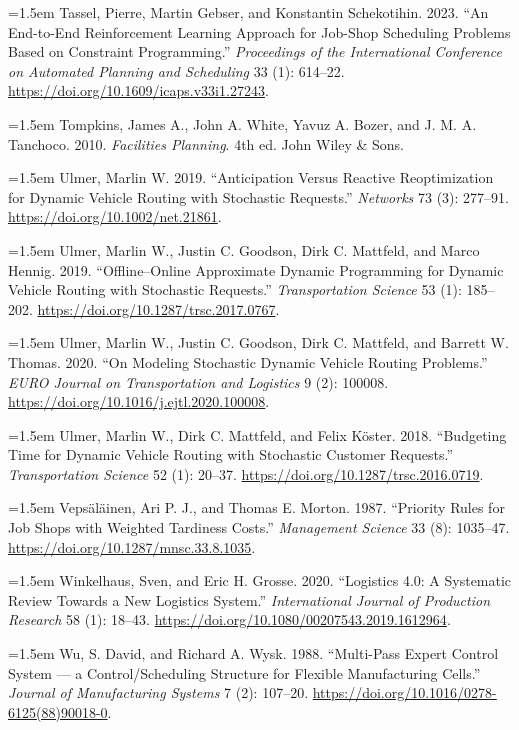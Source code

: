 \documentclass[review,3p,times]{elsarticle}
\newcommand{\citeproctext}{}
\newenvironment{CSLReferences}[2]{%
  \par\addvspace{\baselineskip}%
  \renewcommand{\bibitem}[2][]{\par\addvspace{0.35\baselineskip}\noindent\hangindent=1.5em\hangafter=1}%
}{\par}
\theoremstyle{definition}
\begin{document}
\begin{CSLReferences}{1}{1}
\bibitem[\citeproctext]{ref-tassel2023rljssp}
Tassel, Pierre, Martin Gebser, and Konstantin Schekotihin. 2023. {``An
End-to-End Reinforcement Learning Approach for Job-Shop Scheduling
Problems Based on Constraint Programming.''} \emph{Proceedings of the
International Conference on Automated Planning and Scheduling} 33 (1):
614--22. \url{https://doi.org/10.1609/icaps.v33i1.27243}.

\bibitem[\citeproctext]{ref-tompkins2010facilities}
Tompkins, James A., John A. White, Yavuz A. Bozer, and J. M. A.
Tanchoco. 2010. \emph{Facilities Planning}. 4th ed. John Wiley \& Sons.

\bibitem[\citeproctext]{ref-ulmer2019anticipation}
Ulmer, Marlin W. 2019. {``Anticipation Versus Reactive Reoptimization
for Dynamic Vehicle Routing with Stochastic Requests.''} \emph{Networks}
73 (3): 277--91. \url{https://doi.org/10.1002/net.21861}.

\bibitem[\citeproctext]{ref-ulmer2019offlineonline}
Ulmer, Marlin W., Justin C. Goodson, Dirk C. Mattfeld, and Marco Hennig.
2019. {``Offline--Online Approximate Dynamic Programming for Dynamic
Vehicle Routing with Stochastic Requests.''} \emph{Transportation
Science} 53 (1): 185--202. \url{https://doi.org/10.1287/trsc.2017.0767}.

\bibitem[\citeproctext]{ref-ulmer2020modeling}
Ulmer, Marlin W., Justin C. Goodson, Dirk C. Mattfeld, and Barrett W.
Thomas. 2020. {``On Modeling Stochastic Dynamic Vehicle Routing
Problems.''} \emph{EURO Journal on Transportation and Logistics} 9 (2):
100008. \url{https://doi.org/10.1016/j.ejtl.2020.100008}.

\bibitem[\citeproctext]{ref-ulmer2018budgeting}
Ulmer, Marlin W., Dirk C. Mattfeld, and Felix Köster. 2018. {``Budgeting
Time for Dynamic Vehicle Routing with Stochastic Customer Requests.''}
\emph{Transportation Science} 52 (1): 20--37.
\url{https://doi.org/10.1287/trsc.2016.0719}.

\bibitem[\citeproctext]{ref-vepsalainen1987atc}
Vepsäläinen, Ari P. J., and Thomas E. Morton. 1987. {``Priority Rules
for Job Shops with Weighted Tardiness Costs.''} \emph{Management
Science} 33 (8): 1035--47. \url{https://doi.org/10.1287/mnsc.33.8.1035}.

\bibitem[\citeproctext]{ref-winkelhaus2020logistics4}
Winkelhaus, Sven, and Eric H. Grosse. 2020. {``Logistics 4.0: A
Systematic Review Towards a New Logistics System.''} \emph{International
Journal of Production Research} 58 (1): 18--43.
\url{https://doi.org/10.1080/00207543.2019.1612964}.

\bibitem[\citeproctext]{ref-wu1988multipass}
Wu, S. David, and Richard A. Wysk. 1988. {``Multi-Pass Expert Control
System --- a Control/Scheduling Structure for Flexible Manufacturing
Cells.''} \emph{Journal of Manufacturing Systems} 7 (2): 107--20.
\url{https://doi.org/10.1016/0278-6125(88)90018-0}.

\end{CSLReferences}
\end{document}
